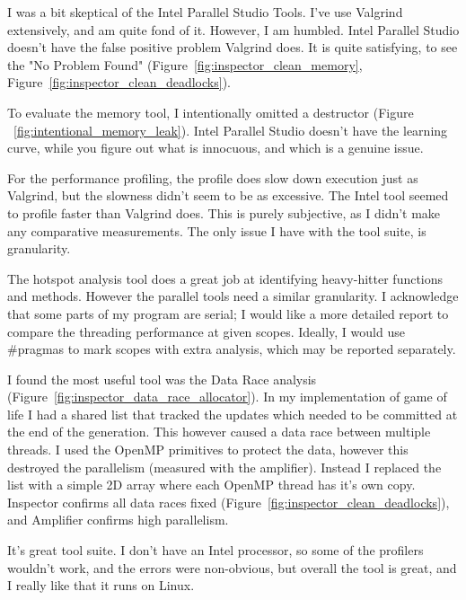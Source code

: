 \documentclass[journal,10pt,onecolumn]{IEEEtran}
\begin{document}
I was a bit skeptical of the Intel Parallel Studio Tools. I've use Valgrind extensively, and am quite
fond of it. However, I am humbled. Intel Parallel Studio doesn't have the false positive problem
Valgrind does. It is quite satisfying, to see the "No Problem Found" (Figure~\ref{fig:inspector_clean_memory},
Figure~\ref{fig:inspector_clean_deadlocks}).

To evaluate the memory tool, I intentionally omitted a destructor (Figure ~\ref{fig:intentional_memory_leak}).
Intel Parallel Studio doesn't have the learning curve, while you figure out what is innocuous, and which is 
a genuine issue.

For the performance profiling, the profile does slow down execution just as 
Valgrind, but the slowness didn't seem to be as excessive.  The Intel tool 
seemed to profile faster than Valgrind does.  This is purely subjective, as 
I didn't make any comparative measurements.  The only issue I have with the tool suite, is granularity.

The hotspot analysis tool does a great job at identifying heavy-hitter functions and methods. However the
parallel tools need a similar granularity. I acknowledge that some parts of my program are serial; I would 
like a more detailed report to compare the threading performance at given scopes. Ideally, I would
 use \#pragmas to mark scopes with extra analysis, which may be reported separately.

I found the most useful tool was the Data Race analysis (Figure~\ref{fig:inspector_data_race_allocator}).  In
my implementation of game of life I had a shared list that tracked the updates which needed to be committed 
at the end of the generation.  This however caused a data race between multiple threads. I used the OpenMP 
primitives to protect the data, however this destroyed the parallelism (measured with the amplifier). Instead 
I replaced the list with a simple 2D array where each OpenMP thread has it's own copy. Inspector confirms all data
races fixed (Figure~\ref{fig:inspector_clean_deadlocks}), and Amplifier confirms high parallelism.

It's great tool suite. I don't have an Intel processor, so some of the profilers 
wouldn't work, and the errors were non-obvious, but overall the tool is great, and 
I really like that it runs on Linux.



\end{document}
